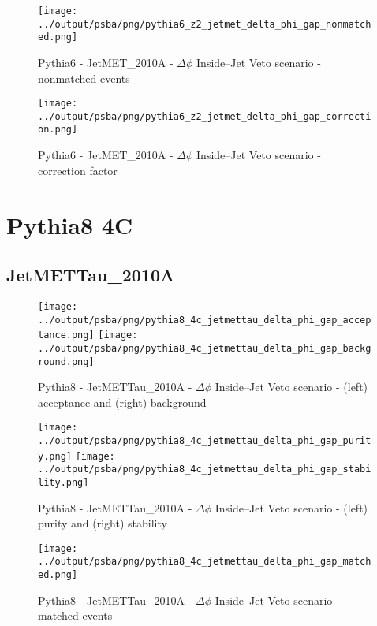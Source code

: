 \documentclass[11pt]{book}
\begin{document}
\begin{figure}[ht]
\centering
\texttt{[image: ../output/psba/png/pythia6\_z2\_jetmet\_delta\_phi\_gap\_nonmatched.png]}
\caption{Pythia6 - JetMET\_2010A - $\Delta\phi$ Inside--Jet Veto scenario - nonmatched events}
\label{fig:p6_jetmet_delta_phi_gap_nonmatched}
\end{figure}

\begin{figure}[ht]
\centering
\texttt{[image: ../output/psba/png/pythia6\_z2\_jetmet\_delta\_phi\_gap\_correction.png]}
\caption{Pythia6 - JetMET\_2010A - $\Delta\phi$ Inside--Jet Veto scenario - correction factor}
\label{fig:p6_jetmet_delta_phi_gap_correction}
\end{figure}


\clearpage
\section{Pythia8 4C}
\subsection{JetMETTau\_2010A}

\begin{figure}[ht]
\centering
\texttt{[image: ../output/psba/png/pythia8\_4c\_jetmettau\_delta\_phi\_gap\_acceptance.png]}
\texttt{[image: ../output/psba/png/pythia8\_4c\_jetmettau\_delta\_phi\_gap\_background.png]}
\caption{Pythia8 - JetMETTau\_2010A - $\Delta\phi$ Inside--Jet Veto scenario - (left) acceptance and (right) background}
\label{fig:p8_jetmettau_delta_phi_gap_ab}
\end{figure}

\begin{figure}[ht]
\centering
\texttt{[image: ../output/psba/png/pythia8\_4c\_jetmettau\_delta\_phi\_gap\_purity.png]}
\texttt{[image: ../output/psba/png/pythia8\_4c\_jetmettau\_delta\_phi\_gap\_stability.png]}
\caption{Pythia8 - JetMETTau\_2010A - $\Delta\phi$ Inside--Jet Veto scenario - (left) purity and (right) stability}
\label{fig:p8_jetmettau_delta_phi_gap_ps}
\end{figure}

\begin{figure}[ht]
\centering
\texttt{[image: ../output/psba/png/pythia8\_4c\_jetmettau\_delta\_phi\_gap\_matched.png]}
\caption{Pythia8 - JetMETTau\_2010A - $\Delta\phi$ Inside--Jet Veto scenario - matched events}
\label{fig:p8_jetmettau_delta_phi_gap_matched}
\end{figure}
\end{document}
